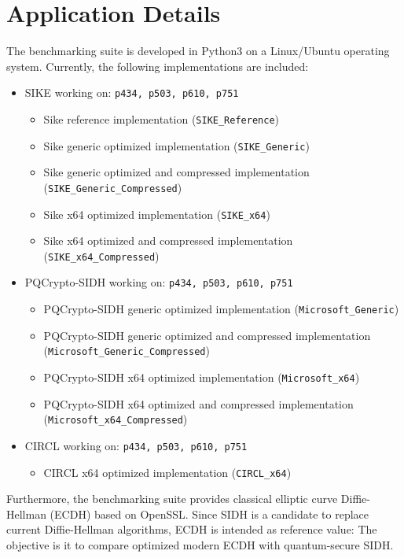 \section{Application Details}\label{sec:benchmarks_details}
The benchmarking suite is developed in Python3 on a Linux/Ubuntu operating system. Currently, the following implementations are included:
\label{sec:included_implementations}
\begin{itemize}
\item SIKE working on: \texttt{p434, p503, p610, p751}
	\begin{itemize}
	\item Sike reference implementation (\texttt{SIKE\_Reference})
	\item Sike generic optimized implementation (\texttt{SIKE\_Generic})
	\item Sike generic optimized and compressed implementation (\texttt{SIKE\_Generic\_Compressed})
	\item Sike x64 optimized implementation (\texttt{SIKE\_x64})
	\item Sike x64 optimized and compressed implementation (\texttt{SIKE\_x64\_Compressed})
	\end{itemize}
\item PQCrypto-SIDH working on: \texttt{p434, p503, p610, p751}
	\begin{itemize}
	\item PQCrypto-SIDH generic optimized implementation (\texttt{Microsoft\_Generic})
	\item PQCrypto-SIDH generic optimized and compressed implementation \\ (\texttt{Microsoft\_Generic\_Compressed})
	\item PQCrypto-SIDH x64 optimized implementation (\texttt{Microsoft\_x64})
	\item PQCrypto-SIDH x64 optimized and compressed implementation \\ (\texttt{Microsoft\_x64\_Compressed})
	\end{itemize}
\item CIRCL working on: \texttt{p434, p503, p610, p751}
	\begin{itemize}
	\item CIRCL x64 optimized implementation (\texttt{CIRCL\_x64})
	\end{itemize}
\end{itemize}
Furthermore, the benchmarking suite provides classical elliptic curve Diffie-Hellman (ECDH) based on OpenSSL. Since SIDH is a candidate to replace current Diffie-Hellman algorithms, ECDH is intended as reference value: The objective is it to compare optimized modern ECDH with quantum-secure SIDH.\\
